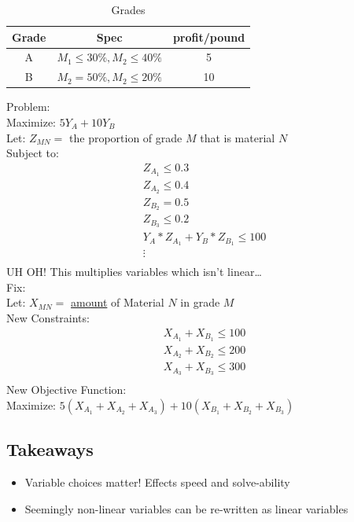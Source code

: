 \documentclass[12pt, letter]{article}
\begin{document}
\begin{table}[h]
	\centering
	\caption{Grades}
	\label{tab:label}
	\begin{tabular}{ccc}
	\hline
	Grade & Spec & profit/pound \\
	\hline
	A & $M_1 \le 30\%, M_2 \le 40\%$ & 5 \\
	\hline
	B & $M_2 = 50\%, M_2 \le 20\%$ & 10 \\
	\hline
	\end{tabular}
\end{table}

Problem: \\
Maximize: $5Y_A+10Y_B$ \\
Let: $Z_{MN} = $ the proportion of grade $M$ that is material $N$ \\
Subject to: \\
\begin{gather*}
Z_{A_1} \le 0.3 \\
Z_{A_2} \le 0.4 \\
Z_{B_2} = 0.5 \\
Z_{B_3} \le 0.2 \\
Y_A * Z_{A_1} + Y_B * Z_{B_1} \le 100 \\
\vdots \\
\end{gather*}
UH OH! This multiplies variables which isn't linear\ldots \\
Fix: \\
Let: $X_{MN} =$ \underline{amount} of Material $N$ in grade  $M$ \\
New Constraints: \\
\begin{gather*}
X_{A_1}+X_{B_1} \le 100 \\
X_{A_2}+X_{B_2} \le 200 \\
X_{A_3} + X_{B_3} \le 300 \\
\end{gather*}
New Objective Function: \\
Maximize: $5(X_{A_1}+X_{A_2}+X_{A_3})+10(X_{B_1}+X_{B_2}+X_{B_3})$

\subsection*{Takeaways}
\begin{itemize}
	\item Variable choices matter! Effects speed and solve-ability
	\item Seemingly non-linear variables can be re-written as linear variables
\end{itemize}
\end{document}
